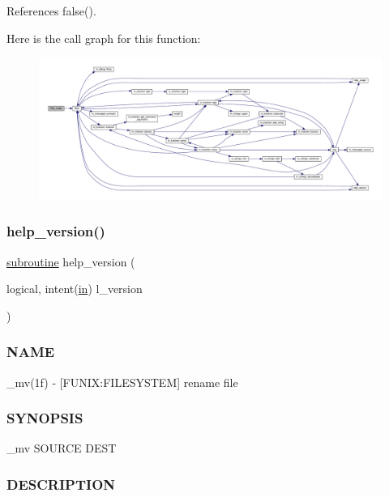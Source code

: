 References false().

Here is the call graph for this function\+:
\nopagebreak
\begin{figure}[H]
\begin{center}
\leavevmode
\includegraphics[width=350pt]{__mv_8f90_a3e09a3b52ee8fb04eeb93fe5761626a8_cgraph}
\end{center}
\end{figure}
\mbox{\label{__mv_8f90_a39c21619b08a3c22f19e2306efd7f766}} 
\subsubsection{\texorpdfstring{help\+\_\+version()}{help\_version()}}
{\footnotesize\ttfamily \hyperlink{M__stopwatch_83_8txt_acfbcff50169d691ff02d4a123ed70482}{subroutine} help\+\_\+version (\begin{DoxyParamCaption}\item[{logical, intent(\hyperlink{M__journal_83_8txt_afce72651d1eed785a2132bee863b2f38}{in})}]{l\+\_\+version }\end{DoxyParamCaption})}



\subsubsection*{N\+A\+ME}

\+\_\+mv(1f) -\/ \mbox{[}F\+U\+N\+IX\+:F\+I\+L\+E\+S\+Y\+S\+T\+EM\mbox{]} rename file \subsubsection*{S\+Y\+N\+O\+P\+S\+IS}

\+\_\+mv S\+O\+U\+R\+CE D\+E\+ST \subsubsection*{D\+E\+S\+C\+R\+I\+P\+T\+I\+ON}

